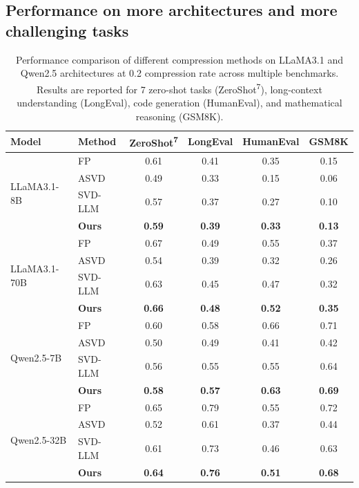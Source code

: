 \newpage
\subsection{Performance on more architectures and more challenging tasks}

\begin{table}[h]
\centering
\caption{{Performance comparison of different compression methods on LLaMA3.1 and Qwen2.5 architectures at 0.2 compression rate across multiple benchmarks. Results are reported for 7 zero-shot tasks (ZeroShot\textsuperscript{7}), long-context understanding (LongEval), code generation (HumanEval), and mathematical reasoning (GSM8K).}}
\label{tab:qwen}
\begin{tabular}{l|l|cccc}
\hline
\textbf{Model} & \textbf{Method} & \textbf{ZeroShot\textsuperscript{7}} & \textbf{LongEval} & \textbf{HumanEval} & \textbf{GSM8K} \\
\hline
\multirow{4}{*}{LLaMA3.1-8B}
 & FP & 0.61 & 0.41 & 0.35 & 0.15 \\
 & ASVD & 0.49 & 0.33 & 0.15 & 0.06 \\
 & SVD-LLM & 0.57 & 0.37 & 0.27 & 0.10 \\
 & \textbf{Ours} & \textbf{0.59} & \textbf{0.39} & \textbf{0.33} & \textbf{0.13} \\
\hline
\multirow{4}{*}{LLaMA3.1-70B}
 & FP & 0.67 & 0.49 & 0.55 & 0.37 \\
 & ASVD & 0.54 & 0.39 & 0.32 & 0.26 \\
 & SVD-LLM & 0.63 & 0.45 & 0.47 & 0.32 \\
 & \textbf{Ours} & \textbf{0.66} & \textbf{0.48} & \textbf{0.52} & \textbf{0.35} \\
\hline
\multirow{4}{*}{Qwen2.5-7B}
 & FP & 0.60 & 0.58 & 0.66 & 0.71 \\
 & ASVD & 0.50 & 0.49 & 0.41 & 0.42 \\
 & SVD-LLM & 0.56 & 0.55 & 0.55 & 0.64 \\
 & \textbf{Ours} & \textbf{0.58} & \textbf{0.57} & \textbf{0.63} & \textbf{0.69} \\
\hline
\multirow{4}{*}{Qwen2.5-32B}
 & FP & 0.65 & 0.79 & 0.55 & 0.72 \\
 & ASVD & 0.52 & 0.61 & 0.37 & 0.44 \\
 & SVD-LLM & 0.61 & 0.73 & 0.46 & 0.63 \\
 & \textbf{Ours} & \textbf{0.64} & \textbf{0.76} & \textbf{0.51} & \textbf{0.68} \\
\hline
\end{tabular}
\end{table}

